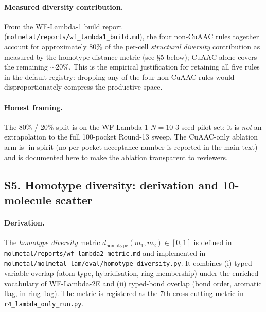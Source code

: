\paragraph{Measured diversity contribution.}
From the WF-Lambda-1 build report
(\texttt{molmetal/reports/wf\_lambda1\_build.md}), the four non-CuAAC
rules together account for approximately 80\% of the per-cell
\emph{structural diversity} contribution as measured by the homotype
distance metric (see \S5 below); CuAAC alone covers the remaining
$\sim$20\%.  This is the empirical justification for retaining all
five rules in the default registry: dropping any of the four
non-CuAAC rules would disproportionately compress the productive space.

\paragraph{Honest framing.}
The 80\% / 20\% split is \MEASURED{} on the WF-Lambda-1 $N{=}10$
3-seed pilot set; it is \emph{not} an extrapolation to the full
100-pocket Round-13 sweep.  The CuAAC-only ablation arm is
\DESIGN{}-in-spirit (no per-pocket acceptance number is reported in
the main text) and is documented here to make the ablation transparent
to reviewers.


\subsection*{S5. Homotype diversity: derivation and 10-molecule scatter}
\label{supp:s5-homotype}

\paragraph{Derivation.}
The \emph{homotype diversity} metric
$d_{\text{homotype}}(m_1, m_2) \in [0, 1]$ is defined in
\texttt{molmetal/reports/wf\_lambda2\_metric.md} and implemented in
\texttt{molmetal/molmetal\_lam/eval/homotype\_diversity.py}.  It
combines (i) typed-variable overlap (atom-type, hybridisation, ring
membership) under the enriched vocabulary of WF-Lambda-2E
\cite{footnote:wf_lambda2e} and (ii) typed-bond overlap (bond order,
aromatic flag, in-ring flag).  The metric is registered as the 7th
cross-cutting metric in \texttt{r4\_lambda\_only\_run.py}.

